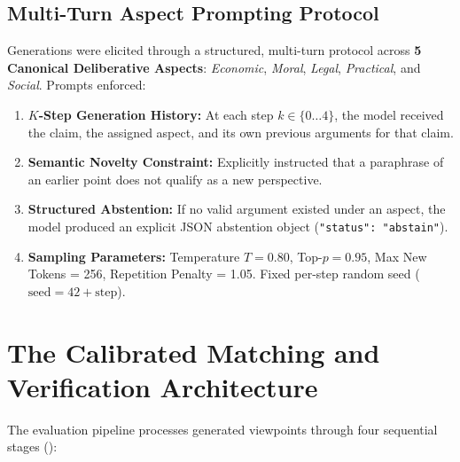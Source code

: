 \documentclass[11pt,a4paper]{article}
\begin{document}
\subsection{Multi-Turn Aspect Prompting Protocol}
Generations were elicited through a structured, multi-turn protocol across \textbf{5 Canonical Deliberative Aspects}: \textit{Economic}, \textit{Moral}, \textit{Legal}, \textit{Practical}, and \textit{Social}. Prompts enforced:
\begin{enumerate}[leftmargin=*,itemsep=1pt]
    \item \textbf{$K$-Step Generation History:} At each step $k \in \{0 \dots 4\}$, the model received the claim, the assigned aspect, and its own previous arguments for that claim.
    \item \textbf{Semantic Novelty Constraint:} Explicitly instructed that a paraphrase of an earlier point does not qualify as a new perspective.
    \item \textbf{Structured Abstention:} If no valid argument existed under an aspect, the model produced an explicit JSON abstention object (\texttt{"status": "abstain"}).
    \item \textbf{Sampling Parameters:} Temperature $T = 0.80$, Top-$p = 0.95$, Max New Tokens = 256, Repetition Penalty = 1.05. Fixed per-step random seed ($\text{seed} = 42 + \text{step}$).
\end{enumerate}

\section{The Calibrated Matching and Verification Architecture}
\label{sec:pipeline}

The evaluation pipeline processes generated viewpoints through four sequential stages ():
\end{document}
